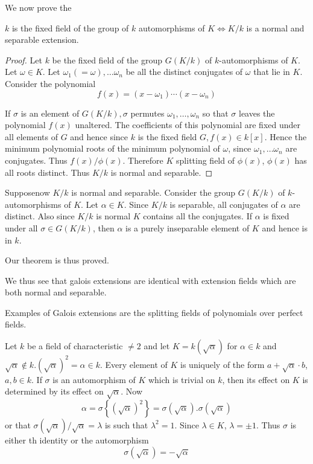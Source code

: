 We now prove the 

\begin{thm}\label{c2:thm7}%
$k$  is the fixed field of the group of $k$ automorphisms of
   $K \Longleftrightarrow K/k$ is a normal and separable
    extension. 
\end{thm}

\begin{proof} 
Let $k$ be the fixed field of the group $G(K/k)$ of $k$-automorphisms of
$K$. Let $\omega \in K$. Let $\omega_1 (= \omega), \ldots \omega_n$ be
all the distinct conjugates of $\omega$ that lie in $K$. Consider the
polynomial  
$$
f(x) = (x - \omega_1) \cdots (x - \omega_n)
$$

If $\sigma$ is an element of $G(K/k), \sigma$ permutes $\omega_1 ,
\ldots , \omega_n$ so that $\sigma$ leaves the polynomial $f(x)$
unaltered. The coefficients of this polynomial are fixed under all
elements of $G$ and hence since $k$ is the fixed field $G, f(x) \in
k[x]$. Hence the minimum polynomial roots of the minimum polynomial of
$\omega$, since $\omega_1 , \ldots \omega_n$ are conjugates. Thus
$f(x)/\phi(x)$. Therefore $K$ splitting field of $\phi(x)$, $\phi(x)$
has all roots distinct. Thus $K/k$ is normal and separable. 
\end{proof}

Suppose\pageoriginale now $K/k$ is normal and separable. Consider the
group $G(K / k)$ of $k$-automorphisms of $K$. Let $\alpha \in
K$. Since $K/k$ is 
separable, all conjugates of $\alpha$ are distinct. Also since $K/k$
is normal $K$ contains all the conjugates. If $\alpha$ is fixed under
all $\sigma \in G(K/k)$, then $\alpha$ is a purely inseparable element
of $K$ and hence is in $k$. 

Our theorem is thus proved.

We thus see that galois extensions are identical with extension fields
which are both normal and separable. 

Examples of Galois extensions are the splitting fields of polynomials
over perfect fields. 

Let $k$ be a field of characteristic $\neq 2$ and let $K =
k(\sqrt{\alpha})$ for $\alpha \in k$ and $\sqrt{\alpha} \notin
k. (\sqrt{\alpha})^2 = \alpha \in k$. Every element of $K$ is uniquely
of the form $a+\sqrt{\alpha} \cdot b$, $a, b \in k$. If $\sigma$ is an
automorphism of $K$ which is trivial on $k$, then its effect on $K$ is
determined by its effect on $\sqrt{\alpha}$. Now 
$$
\alpha = \sigma \left\{ (\sqrt{\alpha})^2 \right\} = \sigma (\sqrt{\alpha})
. \sigma (\sqrt{\alpha}) 
$$
or that $\sigma (\sqrt{\alpha})/ \sqrt{\alpha} = \lambda$ is such that
$\lambda^2 = 1$. Since $\lambda \in K$, $\lambda = \pm 1$. Thus $\sigma$
is either th identity or the automorphism 
$$
\sigma (\sqrt{\alpha}) = - \sqrt{\alpha}
$$


